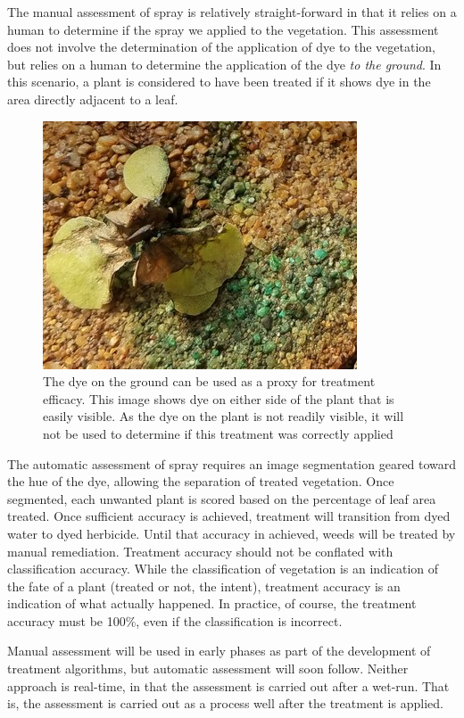 \documentclass[12pt]{article}
\begin{document}
The manual assessment of spray is relatively straight-forward in that it relies on a human to determine if the spray we applied to the vegetation. This assessment does not involve the determination of the application of dye to the vegetation, but relies on a human to determine the application of the dye \textit{to the ground}.  In this scenario, a plant is considered to have been treated if it shows dye in the area directly adjacent to a leaf.
\begin{figure}[H]
	\centering
	\includegraphics[width=0.45\linewidth]{./figures/dye-on-ground.jpg}
	\caption[Dye on the ground as a proxy for treatment accuracy]{The dye on the ground can be used as a proxy for treatment efficacy. This image shows dye on either side of the plant that is easily visible. As the dye on the plant is not readily visible, it will not be used to determine if this treatment was correctly applied}
	\label{fig:dye-on-ground}
\end{figure}

The automatic assessment of spray requires an image segmentation geared toward the hue of the dye, allowing the separation of treated vegetation. Once segmented, each unwanted plant is scored based on the percentage of leaf area treated. Once sufficient accuracy is achieved, treatment will transition from dyed water to dyed herbicide. Until that accuracy in achieved, weeds will be treated by manual remediation. Treatment accuracy should not be conflated with classification accuracy. While the classification of vegetation is an indication of the fate of a plant (treated or not, the intent), treatment accuracy is an indication of what actually happened. In practice, of course, the treatment accuracy must be 100\%, even if the classification is incorrect.

Manual assessment will be used in early phases as part of the development of treatment algorithms, but automatic assessment will soon follow.  Neither approach is real-time, in that the assessment is carried out after a wet-run. That is, the assessment is carried out as a process well after the treatment is applied.
\end{document}

